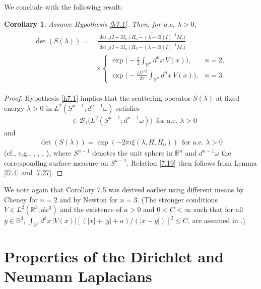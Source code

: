 \documentclass[reqno,10pt, centertags]{amsart}
\makeatletter
\newcounter{count}
\def\theequation{\@arabic\c@equation}
\newcommand{\bbR}{{\mathbb{R}}}
\newcommand{\cB}{{\mathcal B}}
\newcommand{\lb}{\label}
\newcommand{\ol}{\overline}
\newcommand{\la}{\lambda}
\numberwithin{equation}{section}
\newtheorem{corollary}[theorem]{Corollary}
\theoremstyle{definition}
\makeatother
\begin{document}
We conclude with the following result:

\begin{corollary} \lb{c7.6}
Assume Hypothesis \ref{h7.1}. Then, for a.e. $\la>0$,
\begin{align}
\begin{split}
\det(S(\la)) =& \; \frac{\det{}_2\big(I+\ol{M_u(H_0-(\la-i0)I)^{-1}
M_v}\big)}
{\det{}_2\big(I+\ol{M_u(H_0-(\la+i0)I)^{-1}M_v}\big)}  \lb{7.19}
\\
&\times \begin{cases} \exp\big(-\frac{i}{2}\int_{\bbR^n}
d^nx\,V(x)\big), & n=2,
\\[2mm]
\exp\big(-\frac{i \la^{1/2}}{2\pi}\int_{\bbR^n} d^nx\,V(x)\big), &
n=3.
\end{cases}
\end{split}
\end{align}
\end{corollary}
\begin{proof}
Hypothesis \ref{h7.1} implies that the scattering operator $S(\la)$ at
fixed energy $\lambda>0$ in $L^2(S^{n-1};d^{n-1}\omega)$ satisfies
\begin{align}
[S(\la)-I] &\in\cB_1\big(L^2(S^{n-1};d^{n-1}\omega)\big) \, \text{ for
a.e.\ $\lambda>0$}
\end{align}
and
\begin{align}
\det(S(\la)) = \exp(-2\pi i \xi(\la,H,H_0)) \, \text{ for a.e.\ $\la>0$}
\lb{7.27}
\end{align}
(cf., e.g., \cite[Sects.\ 19.1.4, 19.1.5]{BW83}, \cite{BK62}, \cite{BY93},
\cite[Ch.\ 8]{Ya92}), where $S^{n-1}$ denotes the unit sphere in $\bbR^n$
and $d^{n-1}\omega$ the corresponding surface measure on $S^{n-1}$.
Relation \eqref{7.19} then follows from Lemma \ref{l7.4} and \eqref{7.27}.
\end{proof}
We note again that Corollary 7.5 was derived earlier using
different means by Cheney \cite{Ch84} for $n=2$ and by Newton \cite{Ne77}
for $n=3$. (The stronger conditions $V\in L^2(\bbR^3; dx^3)$ and
the existence of $a>0$ and $0<C<\infty$ such that for all $y\in\bbR^3$,
$\int_{\bbR^3} d^3x \, |V(x)| [(|x|+|y|+a)/(|x-y|)]^2 \leq C$, are assumed
in \cite{Ne77}.)


\appendix
\section{Properties of the Dirichlet and Neumann Laplacians}
\lb{sA}
\renewcommand{\theequation}{A.\arabic{equation}}
\renewcommand{\thetheorem}{A.\arabic{theorem}}
\setcounter{theorem}{0} \setcounter{equation}{0}
\end{document}
